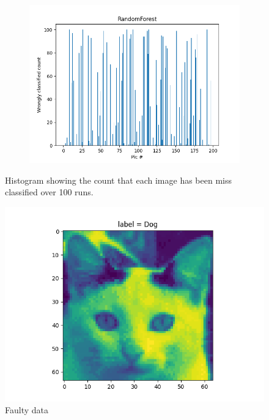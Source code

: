 \documentclass{article}
\begin{document}
\begin{figure}[ht]
\begin{subfigure}{.33\textwidth}
  \label{fig:sub-second}
\end{subfigure}
\begin{subfigure}{.33\textwidth}
  \centering
  \includegraphics[width=1\linewidth]{1a/Random Forest.png}  
  
  \label{fig:sub-second}
\end{subfigure}
\caption{Histogram showing the count that each image has been miss classified over 100 runs.}
\label{wrong}
\end{figure}
\begin{figure}[H]
    \centering
    \includegraphics[scale=0.5]{1a/Dirty data.png}
    \caption{Faulty data}
    \label{faulty data}
\end{figure}
\newpage
\end{document}
